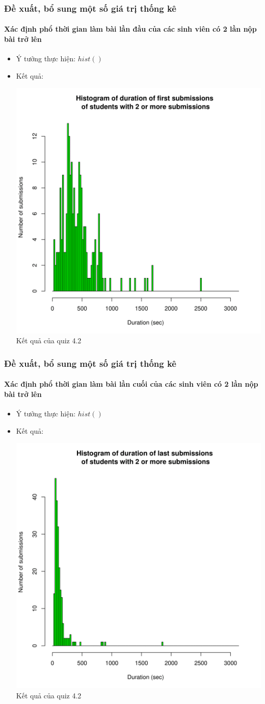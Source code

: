 \documentclass[english,10pt,table]{beamer}
\begin{document}
\frame
{
\frametitle{Đề xuất, bổ sung một số giá trị thống kê}
\framesubtitle{Xác định phổ thời gian làm bài lần đầu của các sinh viên có 2 lần nộp bài trở lên}
\begin{itemize}
    \item Ý tưởng thực hiện: $hist()$
    \item Kết quả:\\
    \begin{center}
        \includegraphics[width = 6 cm]{Images/img12-4-4.png}\\
        Kết quả của quiz 4.2
    \end{center}
\end{itemize}
}

\frame
{
\frametitle{Đề xuất, bổ sung một số giá trị thống kê}
\framesubtitle{Xác định phổ thời gian làm bài lần cuối của các sinh viên có 2 lần nộp bài trở lên}
\begin{itemize}
    \item Ý tưởng thực hiện: $hist()$
    \item Kết quả:\\
    \begin{center}
        \includegraphics[width = 6 cm]{Images/img12-5-4.png}\\
        Kết quả của quiz 4.2
    \end{center}
\end{itemize}
}
\end{document}
